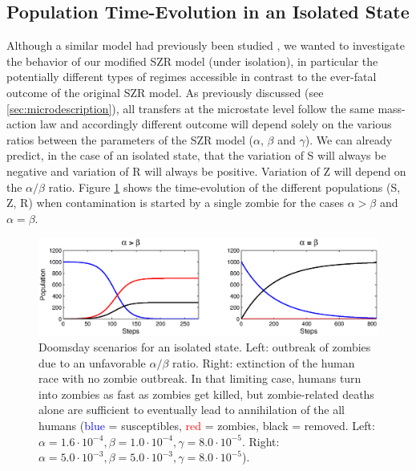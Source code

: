 \documentclass[11pt]{article} %
\begin{document}
\subsection{Population Time-Evolution in an Isolated State}\indent
\label{szr}

Although a similar model had previously been studied \cite{munz2009zombies}, we wanted to investigate the behavior of our modified SZR model (under isolation), in particular the potentially different types of regimes accessible in contrast to the ever-fatal outcome of the original SZR model. As previously discussed (see \ref{sec:microdescription}), all transfers at the microstate level follow the same mass-action law and accordingly different outcome will depend solely on the various ratios between the parameters of the SZR model ($\alpha$, $\beta$ and  $\gamma$). We can already predict, in the case of an isolated state, that the variation of S will always be negative and variation of R will always be positive. Variation of Z will depend on the $\alpha/\beta$ ratio. Figure \ref{deathS} shows the time-evolution of the different populations (S, Z, R) when contamination is started by a single zombie for the cases $\alpha>\beta$ and $\alpha=\beta$.
\begin{figure}[h!]
\centerline{
\includegraphics[scale=0.65]{../images/Matlab_figures/model-AgeB.eps}}
\caption{Doomsday scenarios for an isolated state. Left: outbreak of zombies due to an unfavorable $\alpha/\beta$ ratio. Right: extinction of the human race with no zombie outbreak. In that limiting case, humans turn into zombies as fast as zombies get killed, but zombie-related deaths alone are sufficient to eventually lead to annihilation of the all humans (\textcolor{blue}{blue} = susceptibles, \textcolor{red}{red} = zombies, black = removed. Left: $\alpha=1.6\cdot10^{-4}, \beta=1.0\cdot10^{-4}, \gamma=8.0\cdot10^{-5}$. Right: $\alpha=5.0\cdot10^{-3}, \beta=5.0\cdot10^{-3}, \gamma=8.0\cdot10^{-5} $). \label{deathS} }
\end{figure}
\end{document}
